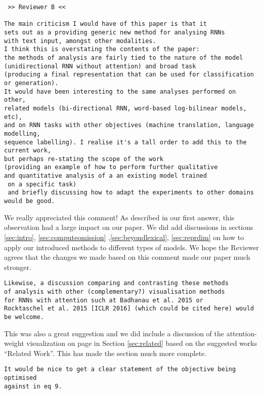 \documentclass{article}
\begin{document}
\begin{verbatim}
 >> Reviewer B <<
 
The main criticism I would have of this paper is that it 
sets out as a providing generic new method for analysing RNNs 
with text input, amongst other modalities. 
I think this is overstating the contents of the paper: 
the methods of analysis are fairly tied to the nature of the model
(unidirectional RNN without attention) and broad task 
(producing a final representation that can be used for classification or generation). 
It would have been interesting to the same analyses performed on other, 
related models (bi-directional RNN, word-based log-bilinear models, etc), 
and on RNN tasks with other objectives (machine translation, language modelling, 
sequence labelling). I realise it's a tall order to add this to the current work,
but perhaps re-stating the scope of the work 
(providing an example of how to perform further qualitative 
and quantitative analysis of a an existing model trained
 on a specific task) 
 and briefly discussing how to adapt the experiments to other domains would be good.
\end{verbatim}

We really appreciated this comment! As described in our first answer, 
this observation had a large impact on our paper. We did add 
discussions in sections \ref{sec:intro}, \ref{sec:computeomission} 
,\ref{sec:beyondlexical}, \ref{sec:reprdim} on how to apply our 
introduced methods to different types of models.
We hope the Reviewer agrees that the changes we made based on 
this comment made our paper much stronger.

\begin{verbatim}
Likewise, a discussion comparing and contrasting these methods
of analysis with other (complementary?) visualisation methods 
for RNNs with attention such at Badhanau et al. 2015 or 
Rocktaschel et al. 2015 [ICLR 2016] (which could be cited here) would be welcome.
\end{verbatim}

This was also a great suggestion and we did include a 
discussion of the attention-weight 
visualization on page \pageref{edit:attention} in 
Section \ref{sec:related} based on the suggested works
``Related Work''. This has made the section much more complete.

\begin{verbatim}
It would be nice to get a clear statement of the objective being optimised
against in eq 9.
\end{verbatim}
\end{document}
